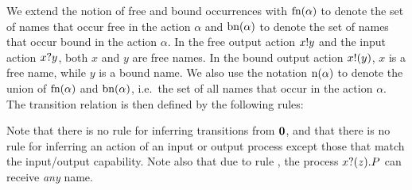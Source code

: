 \documentclass[runningheads]{llncs}
\begin{document}
We extend the notion of free and bound occurrences with
\( \textrm{fn}(\alpha) \) to denote the set of names that occur free in
the action \( \alpha \) and  \( \textrm{bn}(\alpha) \) to
denote the set of names that occur bound in the action \( \alpha \).
In the free output action \( x ! y \) and the input action
\( x ? y \), both \( x \) and \( y \) are free names.  In the
bound output action \( x ! (y) \), \( x \) is a free name, while
\( y \) is a bound name.  We also use the notation
\( \textrm{n}(\alpha) \) to denote the union of \( \textrm{fn}(\alpha) \)
and \( \textrm{bn}(\alpha) \), i.e.\ the set of all names that occur
in the action \( \alpha \).
The transition relation is then defined by the following rules:
Note that there is no rule for inferring transitions from \( \bm{0} \), and that there is no rule for inferring an action of an input or output process except those that match the input/output capability.
Note also that due to rule , the process \( x ? (z) . P \) can receive \emph{any} name.
\end{document}

